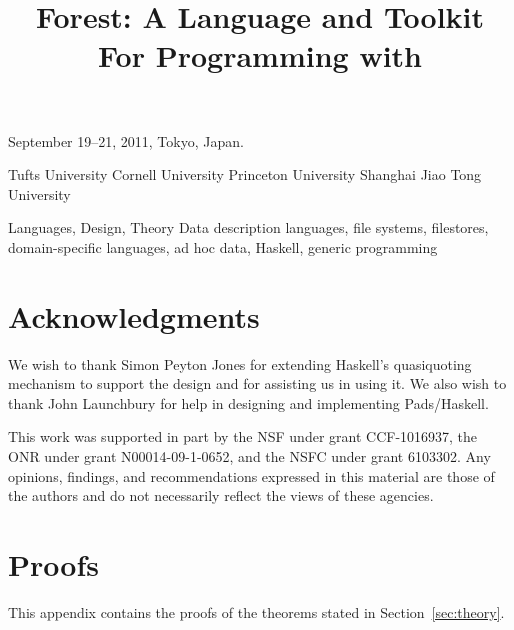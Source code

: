 \documentclass[natbib]{sigplanconf}
\newif\iftr\trfalse              %
\newif\ifappendix\appendixtrue   %
\begin{document}


 {September 19--21, 2011, Tokyo, Japan.}

\title{Forest\iftr{} 1.0\fi: A Language and Toolkit For Programming with \Filestores{}}

	   {Tufts University}{}
           {Cornell University}{}
           {Princeton University}{}
           {Shanghai Jiao Tong University}{}

\maketitle{}

\begin{abstract}  

\end{abstract}

\terms
Languages, Design, Theory
\keywords
Data description languages, file systems, filestores,
domain-specific languages, ad hoc data, Haskell,
generic programming











\section*{Acknowledgments}

We wish to thank Simon Peyton Jones for extending Haskell's
quasiquoting mechanism to support the \forest{} design and for
assisting us in using it.  We also wish to thank John Launchbury for
help in designing and implementing Pads/Haskell.

This work was supported in part by the NSF under grant CCF-1016937,
the ONR under grant N00014-09-1-0652, and the NSFC under grant
6103302. Any opinions, findings, and recommendations expressed in this
material are those of the authors and do not necessarily reflect the
views of these agencies.


\balance


\ifappendix
\onecolumn
\newpage
\appendix

\closeproofchan
\section{Proofs}

\noindent This appendix contains the proofs of the theorems stated in
Section~\ref{sec:theory}.

\label{sec:proof-appendix}

\newpage

\fi
\end{document}
